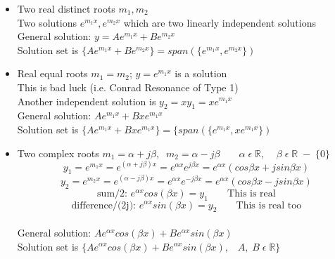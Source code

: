 \documentclass[11pt]{article}
\theoremstyle{definition}
\newcommand{\R}{\mathbb{R}}
\begin{document}
\begin{itemize}[topsep=-10pt]
    \item Two real distinct roots $m_1, m_2$\\
    Two solutions $e^{m_1x}, e^{m_2x}$ which are two linearly independent solutions\\
    General solution: $y = Ae^{m_1x} + Be^{m_2x}$\\
    Solution set is $\{Ae^{m_1x} + Be^{m_2x}\} = span(\{e^{m_1x}, e^{m_2x}\})$
    \item Real equal roots $m_1 = m_2$; $y = e^{m_1x}$ is a solution\\
    This is bad luck (i.e. Conrad Resonance of Type 1)\\
    Another independent solution is $y_2 = xy_1 = xe^{m_1x}$\\
    General solution: $Ae^{m_1x} + Bxe^{m_1x}$\\
    Solution set is $\{Ae^{m_1x} + Bxe^{m_1x}\} = \{span(\{e^{m_1x}, xe^{m_1x}\})$
    \item Two complex roots
    $m_1 = \alpha + j\beta ,\;\; m_2 = \alpha - j\beta \;\;\;\;\;\;\; \alpha\; \epsilon\; \R,\;\;\;\; \beta\; \epsilon\; \R\; -\; \{0\}$\\
    $$y_1 = e^{m_1x} = e^{(\alpha + j\beta)x} = e^{\alpha x} e^{j\beta x} = e^{\alpha x} (cos\beta x + j sin \beta x)$$
    $$y_2 = e^{m_2x} = e^{(\alpha - j\beta)x} = e^{\alpha x} e^{-j\beta x} = e^{\alpha x} (cos\beta x - j sin \beta x)$$
    $$\text{sum/2: } e^{\alpha x}cos(\beta x) = y_1\;\;\;\;\;\;\; \text{This is real}$$
    $$\text{difference/(2j): } e^{\alpha x}sin(\beta x) = y_2\;\;\;\;\;\;\; \text{This is real too}$$\\
     General solution: $Ae^{\alpha x}cos(\beta x) + Be^{\alpha x}sin(\beta x)$\\
    Solution set is $\{Ae^{\alpha x}cos(\beta x) + Be^{\alpha x}sin(\beta x), \;\;\; A,\; B\; \epsilon\; \R\}$
\end{itemize}
\end{document}
